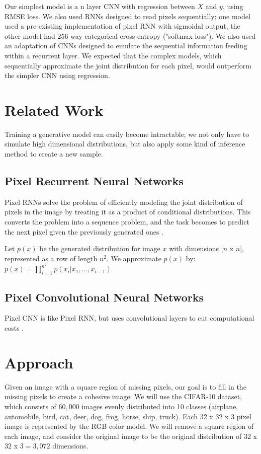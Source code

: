 \documentclass[10pt,twocolumn,letterpaper]{article}
\begin{document}
Our simplest model is a n layer CNN with regression between $X$ and $y$, using RMSE loss. We also used RNNs designed to read pixels sequentially; one model used a pre-existing implementation of pixel RNN with sigmoidal output, the other model had 256-way categorical cross-entropy ("softmax loss"). We also used an adaptation of CNNs designed to emulate the sequential information feeding within a recurrent layer. We expected that the complex models, which sequentially approximate the joint distribution for each pixel, would outperform the simpler CNN using regression.

\section{Related Work} 
Training a generative model can easily become intractable; we not only have to simulate high dimensional distributions, but also apply some kind of inference method to create a new sample. 

\subsection{Pixel Recurrent Neural Networks}
Pixel RNNs solve the problem of efficiently modeling the joint distribution of pixels in the image by treating it as a product of conditional distributions. This converts the problem into a sequence problem, and the task becomes to predict the next pixel given the previously generated ones \cite{pixelRNN}. 

Let $p(x)$ be the generated distribution for image $x$ with dimensions [$n$ x $n$], represented as a row of length $n^2$. We approximate $p(x)$ by: \\
$p(x) = \prod_{i=1}^{n^2} p(x_i | x_1, ... , x_{i-1} )$


\subsection{Pixel Convolutional Neural Networks}
Pixel CNN is like Pixel RNN, but uses convolutional layers to cut computational costs \cite{pixelCNN}.

\section{Approach}
Given an image with a square region of missing pixels, our goal is to fill in the missing pixels to create a cohesive image. We will use the CIFAR-10 dataset, which consists of $60,000$ images evenly distributed into 10 classes (airplane, automobile, bird, cat, deer, dog, frog, horse, ship, truck). Each $32$ x $32$ x $3$ pixel image is represented by the RGB color model. We will remove a square region of each image, and consider the original image to be the original distribution of $32$ x $32$ x $3 = 3,072$ dimensions. 
\end{document}
